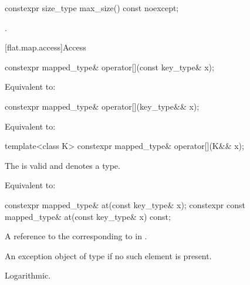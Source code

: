 %
\begin{itemdecl}
constexpr size_type max_size() const noexcept;
\end{itemdecl}

\begin{itemdescr}
\pnum
\returns
{}.
\end{itemdescr}

[flat.map.access]{Access}

%
\begin{itemdecl}
constexpr mapped_type& operator[](const key_type& x);
\end{itemdecl}

\begin{itemdescr}
\pnum
\effects
Equivalent to: 
\end{itemdescr}

%
\begin{itemdecl}
constexpr mapped_type& operator[](key_type&& x);
\end{itemdecl}

\begin{itemdescr}
\pnum
\effects
Equivalent to: 
\end{itemdescr}

%
\begin{itemdecl}
template<class K> constexpr mapped_type& operator[](K&& x);
\end{itemdecl}

\begin{itemdescr}
\pnum
\constraints
The   is valid and
denotes a type.

\pnum
\effects
Equivalent to: 
\end{itemdescr}

%
\begin{itemdecl}
constexpr mapped_type&       at(const key_type& x);
constexpr const mapped_type& at(const key_type& x) const;
\end{itemdecl}

\begin{itemdescr}
\pnum
\returns
A reference to the  corresponding
to  in .

\pnum
\throws
An exception object of type  if
no such element is present.

\pnum
\complexity
Logarithmic.
\end{itemdescr}

